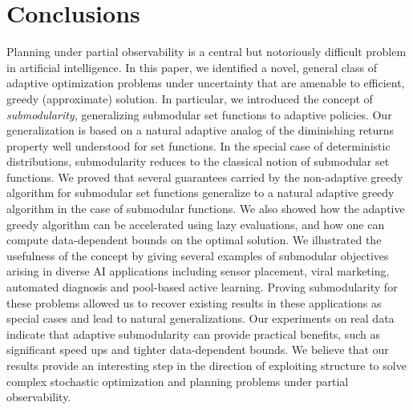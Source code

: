 %
\section{Conclusions}
%
\label{sec:conclusions}
Planning under partial observability is a central but notoriously difficult problem in artificial intelligence.
In this paper, we identified a novel, general class of adaptive optimization problems under uncertainty that are amenable to efficient, greedy (approximate) solution.
In particular, we introduced the concept of \emph{\term
  submodularity}, generalizing submodular set functions to adaptive
policies.  Our generalization is based on a natural adaptive analog of the
diminishing returns property well understood for set functions.
In the special case of deterministic
distributions, \term submodularity reduces to the classical notion of
submodular set functions. We proved that several guarantees carried by the
non-adaptive greedy algorithm for submodular set functions generalize
to a natural adaptive greedy algorithm in the case of \term submodular
functions.  We also showed how the adaptive greedy algorithm can be accelerated using lazy evaluations, and how one can compute data-dependent bounds on the optimal solution. 
We illustrated the usefulness of the concept by
giving several examples of \term submodular objectives arising in
diverse AI applications including sensor placement, viral marketing, automated diagnosis and
pool-based active learning. Proving \term submodularity for these
problems allowed us to recover existing results in these applications
as special cases and lead to natural generalizations. 
Our experiments on real data indicate that adaptive submodularity can
provide practical benefits, such as significant speed ups  
and tighter data-dependent bounds.
We believe that our results provide an interesting step in the
direction of exploiting structure to solve complex stochastic optimization and planning problems under partial observability. 







%
%
%
%
%
